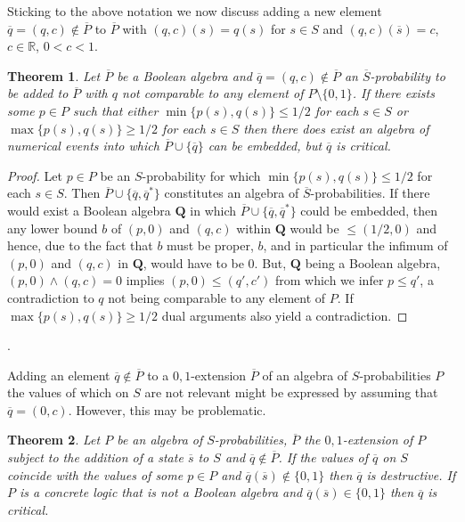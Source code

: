 \documentclass[12pt]{article}
\newtheorem{theorem}{Theorem}[section]
\begin{document}
Sticking to the above notation we now discuss adding a new element $\overline q=(q,c)\notin\overline P$ to $\overline P$ with $(q,c)(s)=q(s)$ for $s\in S$ and $(q,c)(\overline s) = c$, $c\in\mathbb R$, $0<c<1$.

\begin{theorem}\label{th2}
Let $\overline P$ be a Boolean algebra and $\overline q=(q,c)\notin\overline P$ an $\overline S$-probability to be added to $\overline P$ with $q$ not comparable to any element of $P\setminus\{0,1\}$. If there exists some $p\in P$ such that either $\min\{p(s),q(s)\}\le1/2$ for each $s\in S$ or $\max\{p(s),q(s)\}\ge1/2$ for each $s\in S$ then there does exist an algebra of numerical events into which $\overline P\cup\{\overline q\}$ can be embedded, but $\overline q$ is critical.
\end{theorem}

\begin{proof}
Let $p\in P$ be an $S$-probability for which $\min\{p(s),q(s)\}\le1/2$ for each $s\in S$. Then $\overline P\cup\{\overline q,\overline q^*\}$ constitutes an algebra of $\overline S$-probabilities. If there would exist a Boolean algebra $\mathbf Q$ in which $\overline P\cup\{\overline q,\overline q^*\}$ could be embedded, then any lower bound $b$ of $(p,0)$ and $(q,c)$ within $\mathbf Q$ would be $\le(1/2,0)$ and hence, due to the fact that $b$ must be proper, $b$, and in particular the infimum of $(p,0)$ and $(q,c)$ in $\mathbf Q$, would have to be $0$. But, $\mathbf Q$ being a Boolean algebra, $(p,0)\wedge(q,c)=0$ implies $(p,0)\le(q',c')$ from which we infer $p\le q'$, a contradiction to $q$ not being comparable to any element of $P$. If $\max\{p(s),q(s)\}\ge1/2$ dual arguments also yield a contradiction.
\end{proof}.

Adding an element $\overline q\notin\overline P$ to a $0,1$-extension $\overline P$ of an algebra of $S$-probabilities $P$ the values of which on $S$ are not relevant might be expressed by assuming that $\overline q=(0,c)$. However, this may be problematic.

\begin{theorem}\label{th3}
Let $P$ be an algebra of $S$-probabilities, $\overline P$ the $0,1$-extension of $P$ subject to the addition of a state $\overline s$ to $S$ and $\overline q\notin\overline P$. If the values of $\overline q$ on $S$ coincide with the values of some $p\in P$ and $\overline q(\overline s)\notin\{0,1\}$ then $\overline q$ is destructive. If $P$ is a concrete logic that is not a Boolean algebra and $\overline q(\overline s)\in\{0,1\}$ then $\overline q$ is critical.
\end{theorem}
\end{document}
